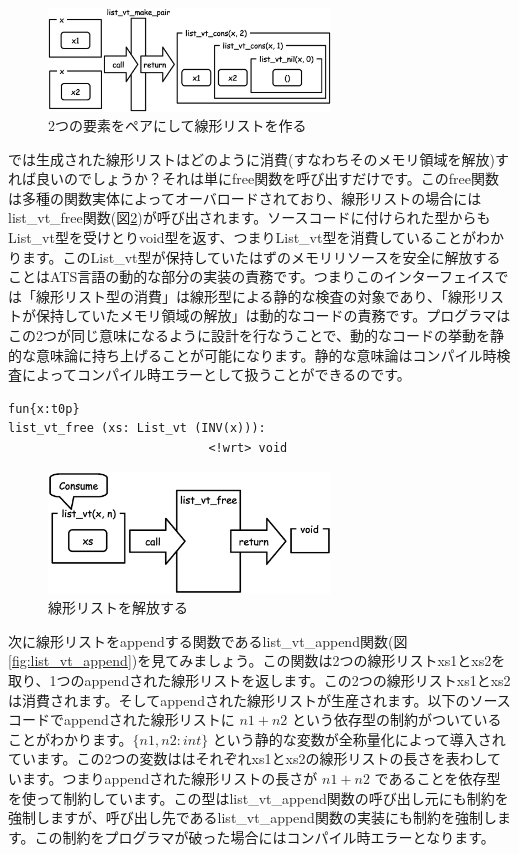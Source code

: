 \documentclass{ipsjprosym}
\begin{document}
\begin{figure}[h]
\centering
\includegraphics[width=75mm]{draw/list_vt_make_pair.eps}
\caption{2つの要素をペアにして線形リストを作る}
\label{fig:list_vt_make_pair}
\end{figure}

では生成された線形リストはどのように消費(すなわちそのメモリ領域を解放)すれば良いのでしょうか？それは単にfree関数を呼び出すだけです。このfree関数は多種の関数実体によってオーバロードされており、線形リストの場合にはlist\_vt\_free関数(図\ref{fig:list_vt_free})が呼び出されます。ソースコードに付けられた型からもList\_vt型を受けとりvoid型を返す、つまりList\_vt型を消費していることがわかります。このList\_vt型が保持していたはずのメモリリソースを安全に解放することはATS言語の動的な部分の実装の責務です。つまりこのインターフェイスでは「線形リスト型の消費」は線形型による静的な検査の対象であり、「線形リストが保持していたメモリ領域の解放」は動的なコードの責務です。プログラマはこの2つが同じ意味になるように設計を行なうことで、動的なコードの挙動を静的な意味論に持ち上げることが可能になります。静的な意味論はコンパイル時検査によってコンパイル時エラーとして扱うことができるのです。

\vspace{3mm}
\begin{verbatim}
fun{x:t0p}
list_vt_free (xs: List_vt (INV(x))):
                            <!wrt> void
\end{verbatim}
\vspace{3mm}

\begin{figure}[h]
\centering
\includegraphics[width=75mm]{draw/list_vt_free.eps}
\caption{線形リストを解放する}
\label{fig:list_vt_free}
\end{figure}


次に線形リストをappendする関数であるlist\_vt\_append関数(図\ref{fig:list_vt_append})を見てみましょう。この関数は2つの線形リストxs1とxs2を取り、1つのappendされた線形リストを返します。この2つの線形リストxs1とxs2は消費されます。そしてappendされた線形リストが生産されます。以下のソースコードでappendされた線形リストに $n1+n2$ という依存型の制約がついていることがわかります。$\{n1,n2:int\}$ という静的な変数が全称量化によって導入されています。この2つの変数ははそれぞれxs1とxs2の線形リストの長さを表わしています。つまりappendされた線形リストの長さが $n1+n2$ であることを依存型を使って制約しています。この型はlist\_vt\_append関数の呼び出し元にも制約を強制しますが、呼び出し先であるlist\_vt\_append関数の実装にも制約を強制します。この制約をプログラマが破った場合にはコンパイル時エラーとなります。
\end{document}
